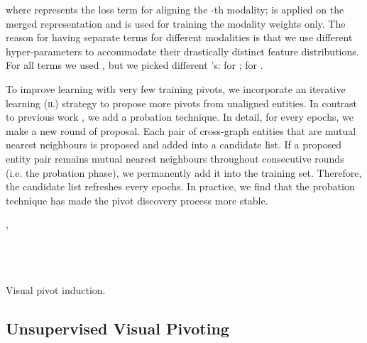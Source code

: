 \documentclass[letterpaper]{article} \usepackage{aaai21}  \usepackage{times}  \usepackage{helvet} \usepackage{courier}  \usepackage[hyphens]{url}  \usepackage{graphicx} \urlstyle{rm} \def\UrlFont{\rm}  \usepackage{natbib}  \usepackage{caption} \frenchspacing  \setlength{\pdfpagewidth}{8.5in}  \setlength{\pdfpageheight}{11in}
\newcommand{\stitle}[1]{\vspace{0.3ex} \noindent{\bf #1}}
\begin{document}
where  represents the loss term for aligning the -th modality;  is applied on the merged representation  and is used for training the modality weights only. The reason for having separate terms for different modalities is that we use different hyper-parameters to accommodate their drastically distinct feature distributions. For all terms we used , but we picked different 's:  for ;  for .


\stitle{Iterative learning.}
\label{sec:iter}
To improve learning with very few training pivots,
we incorporate an iterative learning (\textsc{il}) strategy to propose more pivots from unaligned entities.
In contrast to previous work
\citep{sun2018bootstrapping}, we add a probation technique. In detail, for every  epochs, we make a new round of proposal. Each pair of cross-graph entities that are mutual nearest neighbours is proposed and added into a candidate list. If a proposed entity pair remains mutual nearest neighbours throughout  consecutive rounds (i.e. the probation phase), we permanently add it into the training set. Therefore, the candidate list refreshes every  epochs.
In practice, we find that the probation technique has made the pivot discovery process more stable.



\begin{algorithm}[t!]
\small
\SetAlgoLined
{}
,   \\
  \\
  \\
  \\
\Return  {}
 \caption{Visual pivot induction.}
 \label{alg:unsup}
\end{algorithm}




\subsection{Unsupervised Visual Pivoting}\label{sec:method_unsup}
\end{document}
